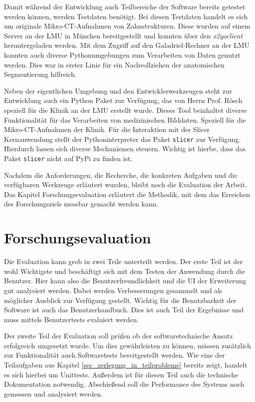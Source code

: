 Damit während der Entwicklung auch Teilbereiche der Software bereits getestet werden
können, werden Testdaten benötigt. Bei diesen Testdaten handelt es sich um originale
Mikro-\ac{CT}-Aufnahmen von Zahnstrukturen. Diese wurden auf einem Server an der
\ac{LMU} in München bereitgestellt und konnten über den \textit{x2goclient} heruntergeladen
werden. Mit dem Zugriff auf den Galadriel-Rechner an der \ac{LMU} konnten auch diverse
Pythonumgebungen zum Verarbeiten von Daten genutzt werden. Dies war in erster
Linie für ein Nachvollziehen der anatomischen Segmentierung hilfreich.

Neben der eigentlichen Umgebung und den Entwicklerwerkzeugen steht zur
Entwicklung auch ein Python Paket zur Verfügung, das von Herrn Prof. Rösch
speziell für die Klinik an der \ac{LMU} erstellt wurde. Dieses Tool beinhaltet
diverse Funktionalität für das Verarbeiten von medizinischen Bilddaten. Speziell
für die Mikro-\ac{CT}-Aufnahmen der Klinik. Für die Interaktion mit der Slicer Kernanwendung
stellt der Pythoninterpreter das Paket \texttt{slicer} zur Verfügung. Hierdurch lassen
sich diverse Mechanismen steuern. Wichtig ist hierbe, dass das Paket \texttt{slicer}
nicht auf \ac{PyPi} zu finden ist.

Nachdem die Anforderungen, die Recherche, die konkreten Aufgaben und die verfügbaren
Werkzeuge erläutert wurden, bleibt noch die Evaluation der Arbeit. Das Kapitel Forschungsevaluation
erläutert die Methodik, mit dem das Erreichen des Forschungsziels messbar
gemacht werden kann.


\section{Forschungsevaluation}
Die Evaluation kann grob in zwei Teile unterteilt werden. Der erste Teil ist der
wohl Wichtigste und beschäftigt sich mit dem Testen der Anwendung durch die
Benutzer. Hier kann also die Benutzerfreundlichkeit und die \ac{UI} der
Erweiterung gut analysiert werden. Dabei werden Verbesserungen gesammelt und als
möglicher Ausblick zur Verfügung gestellt. Wichtig für die Benutzbarkeit der
Software ist auch das Benutzerhandbuch. Dies ist auch Teil der Ergebnisse und muss
mittels Benutzertests evaluiert werden.

Der zweite Teil der Evaluation soll prüfen ob der softwaretechnische Ansatz erfolgreich
umgesetzt wurde. Um dies gewährleisten zu können, müssen zusätzlich zur Funktionalität
auch Softwaretests bereitgestellt werden. Wie eine der Teilaufgaben aus Kapitel
\ref{sec_zerlegung_in_teilprobleme} bereits zeigt, handelt es sich hierbei um Unittests.
Außerdem ist für diesen Teil auch die technische Dokumentation notwendig. Abschießend
soll die Performance des Systems noch gemessen und analysiert werden.

